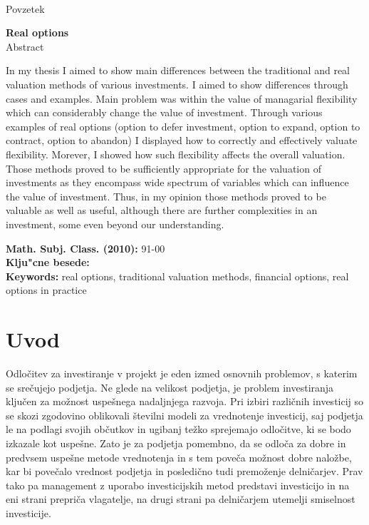 \thispagestyle{empty}
\begin{center}
{\bf \naslovdela}\\[3mm]
{\sc Povzetek}
\end{center}
\povzetek
\vfill
\begin{center}
{\bf Real options}\\[3mm] 
{\sc Abstract}
\end{center}
In my thesis I aimed to show  main differences between the traditional and real valuation methods of various investments. I aimed to show differences through cases and examples. Main problem was within the value of managarial flexibility which can considerably change the value of investment. Through various examples of real options (option to defer investment, option to expand, option to contract, option to abandon) I displayed how to correctly and effectively valuate flexibility. Morever, I showed how such flexibility affects the overall valuation. Those methods proved to be sufficiently appropriate for the valuation of investments as they encompass wide spectrum of variables which can influence the value of investment. Thus, in my opinion those methods proved to be valuable as well as useful, although there are further complexities in an investment, some even  beyond our understanding.

\vfill\noindent
{\bf Math. Subj. Class. (2010):} 	91-00   \\[1mm]  
{\bf Klju"cne besede:} \kljucnebesede  \\[1mm]
{\bf Keywords:} real options, traditional valuation methods, financial options, real options in practice
\pagebreak


\section{Uvod}
Odločitev za investiranje v projekt je eden izmed osnovnih problemov, s katerim se srečujejo podjetja. Ne glede na velikost podjetja, je problem investiranja ključen za možnost uspešnega nadaljnjega razvoja. Pri izbiri različnih investicij so se skozi zgodovino oblikovali številni modeli za vrednotenje investicij, saj podjetja le na podlagi svojih občutkov in ugibanj težko sprejemajo odločitve, ki se bodo izkazale kot uspešne. Zato je za podjetja pomembno, da se odloča za dobre in predvsem uspešne metode vrednotenja in s tem poveča možnost dobre naložbe, kar bi povečalo vrednost podjetja in posledično tudi premoženje delničarjev. Prav tako pa management z uporabo investicijskih metod predstavi investicijo in na eni strani prepriča vlagatelje, na drugi strani pa delničarjem utemelji smiselnost investicije.\\

